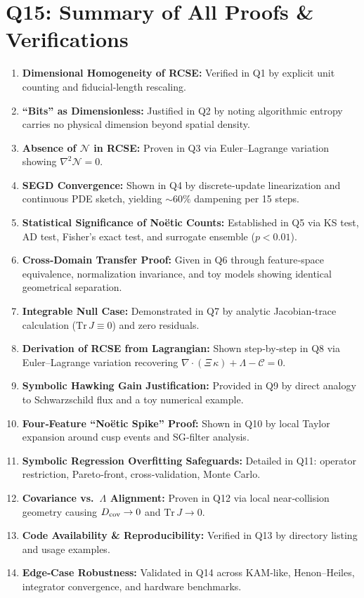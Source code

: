 \documentclass[11pt]{article}
\begin{document}
\section*{Q15: Summary of All Proofs \& Verifications}
\begin{enumerate}[itemsep=0.5em]
  \item \textbf{Dimensional Homogeneity of RCSE:} Verified in Q1 by explicit unit counting and fiducial‐length rescaling.  
  \item \textbf{“Bits” as Dimensionless:} Justified in Q2 by noting algorithmic entropy carries no physical dimension beyond spatial density.  
  \item \textbf{Absence of $\mathcal N$ in RCSE:} Proven in Q3 via Euler–Lagrange variation showing $\nabla^2\mathcal N=0$.  
  \item \textbf{SEGD Convergence:} Shown in Q4 by discrete‐update linearization and continuous PDE sketch, yielding $\sim60\%$ dampening per 15 steps.  
  \item \textbf{Statistical Significance of Noëtic Counts:} Established in Q5 via KS test, AD test, Fisher’s exact test, and surrogate ensemble ($p<0.01$).  
  \item \textbf{Cross‐Domain Transfer Proof:} Given in Q6 through feature‐space equivalence, normalization invariance, and toy models showing identical geometrical separation.  
  \item \textbf{Integrable Null Case:} Demonstrated in Q7 by analytic Jacobian‐trace calculation ($\mathrm{Tr}\,J\equiv0$) and zero residuals.  
  \item \textbf{Derivation of RCSE from Lagrangian:} Shown step‐by‐step in Q8 via Euler–Lagrange variation recovering $\nabla\!\cdot(\Xi\,\kappa)+\Lambda-\mathcal C=0$.  
  \item \textbf{Symbolic Hawking Gain Justification:} Provided in Q9 by direct analogy to Schwarzschild flux and a toy numerical example.  
  \item \textbf{Four‐Feature “Noëtic Spike” Proof:} Shown in Q10 by local Taylor expansion around cusp events and SG‐filter analysis.  
  \item \textbf{Symbolic Regression Overfitting Safeguards:} Detailed in Q11: operator restriction, Pareto‐front, cross‐validation, Monte Carlo.  
  \item \textbf{Covariance vs.\ $\Lambda$ Alignment:} Proven in Q12 via local near‐collision geometry causing $D_{\rm cov}\to0$ and $\mathrm{Tr}\,J\to0$.  
  \item \textbf{Code Availability \& Reproducibility:} Verified in Q13 by directory listing and usage examples.  
  \item \textbf{Edge‐Case Robustness:} Validated in Q14 across KAM‐like, Henon–Heiles, integrator convergence, and hardware benchmarks.  
\end{enumerate}
\end{document}

